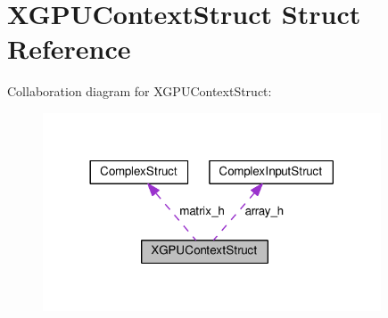 \hypertarget{struct_x_g_p_u_context_struct}{}\section{X\+G\+P\+U\+Context\+Struct Struct Reference}
\label{struct_x_g_p_u_context_struct}


Collaboration diagram for X\+G\+P\+U\+Context\+Struct\+:\nopagebreak
\begin{figure}[H]
\begin{center}
\leavevmode
\includegraphics[width=284pt]{struct_x_g_p_u_context_struct__coll__graph}
\end{center}
\end{figure}
